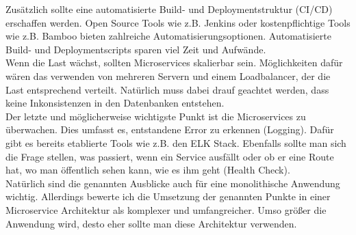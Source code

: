 Zusätzlich sollte eine automatisierte Build- und Deploymentstruktur (CI/CD) erschaffen werden. Open Source Tools wie z.B. Jenkins oder kostenpflichtige Tools wie z.B. Bamboo bieten zahlreiche Automatisierungsoptionen. Automatisierte Build- und Deploymentscripts sparen viel Zeit und Aufwände. \\

Wenn die Last wächst, sollten Microservices skalierbar sein. Möglichkeiten dafür wären das verwenden von mehreren Servern und einem Loadbalancer, der die Last entsprechend verteilt. Natürlich muss dabei drauf geachtet werden, dass keine Inkonsistenzen in den Datenbanken entstehen. \\

Der letzte und möglicherweise wichtigste Punkt ist die Microservices zu überwachen. Dies umfasst es, entstandene Error zu erkennen (Logging). Dafür gibt es bereits etablierte Tools wie z.B. den ELK Stack. Ebenfalls sollte man sich die Frage stellen, was passiert, wenn ein Service ausfällt oder ob er eine Route hat, wo man öffentlich sehen kann, wie es ihm geht (Health Check). \\
 
Natürlich sind die genannten Ausblicke auch für eine monolithische Anwendung wichtig. Allerdings bewerte ich die Umsetzung der genannten Punkte in einer Microservice Architektur als komplexer und umfangreicher. Umso größer die Anwendung wird, desto eher sollte man diese Architektur verwenden.